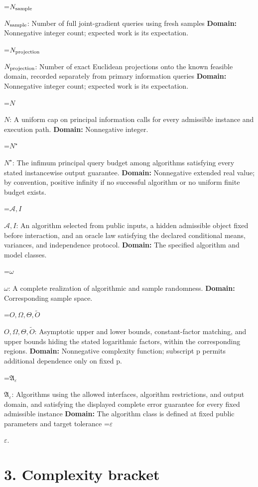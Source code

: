 \documentclass[10pt,a4paper]{article}
\newcommand{\AtlasMath}[1]{\par\begingroup\centering\setbox0=\hbox{$\displaystyle #1$}\ifdim\wd0>1.4\linewidth\typeout{ATLAS WIDE FORMULA: \the\wd0}\fi\ifdim\wd0>\linewidth\resizebox{\linewidth}{!}{\box0}\else\box0\fi\par\endgroup}
\newcommand{\AtlasInlineMath}[1]{\begingroup\setbox0=\hbox{$#1$}\ifdim\wd0>.4\linewidth\endgroup\AtlasMath{#1}\else\endgroup$#1$\fi}
\begin{document}
\AtlasInlineMath{N_{\rm sample}}: Number of full joint-gradient queries using fresh samples \textbf{Domain:} Nonnegative integer count; expected work is its expectation.



\AtlasInlineMath{N_{\rm projection}}: Number of exact Euclidean projections onto the known feasible domain, recorded separately from primary information queries \textbf{Domain:} Nonnegative integer count; expected work is its expectation.



\AtlasInlineMath{N}: A uniform cap on principal information calls for every admissible instance and execution path. \textbf{Domain:} Nonnegative integer.



\AtlasInlineMath{N^\star}: The infimum principal query budget among algorithms satisfying every stated instancewise output guarantee. \textbf{Domain:} Nonnegative extended real value; by convention, positive infinity if no successful algorithm or no uniform finite budget exists.



\AtlasInlineMath{\mathcal A,I}: An algorithm selected from public inputs, a hidden admissible object fixed before interaction, and an oracle law satisfying the declared conditional means, variances, and independence protocol. \textbf{Domain:} The specified algorithm and model classes.



\AtlasInlineMath{\omega}: A complete realization of algorithmic and sample randomness. \textbf{Domain:} Corresponding sample space.



\AtlasInlineMath{O,\Omega,\Theta,\widetilde O}: Asymptotic upper and lower bounds, constant-factor matching, and upper bounds hiding the stated logarithmic factors, within the corresponding regions. \textbf{Domain:} Nonnegative complexity function; subscript p permits additional dependence only on fixed p.



\AtlasInlineMath{\mathfrak A_\varepsilon}: Algorithms using the allowed interfaces, algorithm restrictions, and output domain, and satisfying the displayed complete error guarantee for every fixed admissible instance \textbf{Domain:} The algorithm class is defined at fixed public parameters and target tolerance \AtlasInlineMath{\varepsilon}.



\section{3. Complexity bracket}
\end{document}
